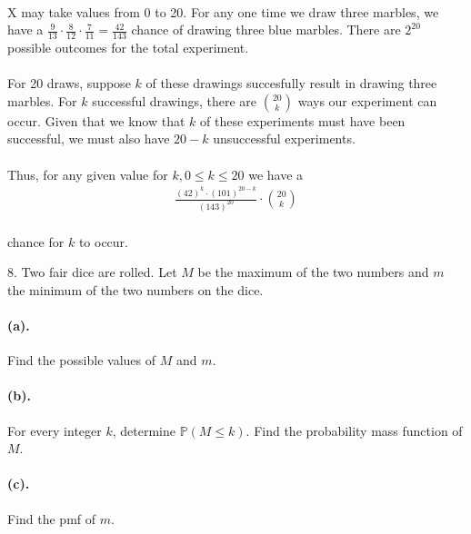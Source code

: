 \documentclass{article}
\begin{document}
\paragraph{}X may take values from 0 to 20. For any one time we draw three marbles, we have a $\frac{9}{13}
\cdot \frac{8}{12} \cdot \frac{7}{11} = \frac{42}{143}$ chance of drawing three blue marbles. There are $2^{20}$ possible
outcomes for the total experiment. 

\paragraph{}For 20 draws, suppose $k$ of these drawings succesfully result in drawing three marbles. For $k$ 
successful drawings, there are $\binom{20}{k}$ ways our experiment
can occur. Given that we know that $k$ of these experiments must have been successful, we must also have
$20-k$ unsuccessful experiments.

\paragraph{}Thus, for any given value for $k, 0 \le k \le 20$ we have a 
\begin{align*}
    \frac{(42)^{k}\cdot (101)^{20-k}}{(143)^{20}}\cdot \binom{20}{k}
\end{align*}
\paragraph{}chance for $k$ to occur.

\vspace{5mm}

8. Two fair dice are rolled. Let $M$ be the maximum of the two numbers and $m$ the minimum
of the two numbers on the dice.

\paragraph{(a).} Find the possible values of $M$ and $m$.

\paragraph{(b).} For every integer $k$, determine $\mathbb{P}(M \le k)$. Find the probability mass function of
$M$.
\paragraph{(c).} Find the pmf of $m$.
\end{document}

